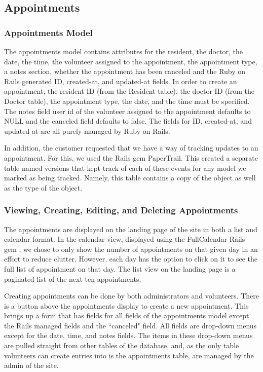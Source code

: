 \documentclass{sig-alternate}
\begin{document}
\subsection{Appointments}

\subsubsection{Appointments Model}
The appointments model contains attributes for the resident, the doctor, the date, the time, the volunteer assigned to the appointment, the appointment type, a notes section, whether the appointment has been canceled and the Ruby on Rails generated ID, created-at, and updated-at fields.  In order to create an appointment, the resident ID (from the Resident table), the doctor ID (from the Doctor table), the appointment type, the date, and the time must be specified.  The notes field user id of the volunteer assigned to the appointment defaults to NULL and the canceled field defaults to false.  The fields for ID, created-at, and updated-at are all purely managed by Ruby on Rails. 

In addition, the customer requested that we have a way of tracking updates to an appointment.  For this, we used the Rails gem PaperTrail. \cite{papertrail}  This created a separate table named versions that kept track of each of these events for any model we marked as being tracked.  Namely, this table contains a copy of the object as well as the type of the object.

\subsubsection{Viewing, Creating, Editing, and Deleting Appointments}
The appointments are displayed on the landing page of the site in both a list and calendar format.  In the calendar view, displayed using the FullCalendar Rails gem \cite{fullcalendar}, we chose to only show the number of appointments on that given day in an effort to reduce clutter.  However, each day has the option to click on it to see the full list of appointment on that day.  The list view on the landing page is a paginated list of the next ten appointments.

Creating appointments can be done by both administrators and volunteers.  There is a button above the appointments display to create a new appointment.  This brings up a form that has fields for all fields of the appointments model except the Rails managed fields and the ``canceled" field.  All fields are drop-down menus except for the date, time, and notes fields.  The items in these drop-down menus are pulled straight from other tables of the database, and, as the only table volunteers can create entries into is the appointments table, are managed by the admin of the site.
\end{document}
